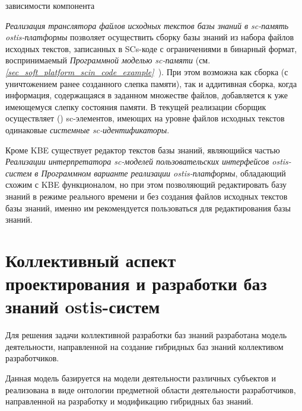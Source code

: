\begin{SCn}

\begin{scnrelfromset}{зависимости компонента}
\end{scnrelfromset}
\end{SCn}

\textit{Реализация транслятора файлов исходных текстов базы знаний в sc-память ostis-платформы} позволяет осуществить сборку базы знаний из набора файлов исходных текстов, записанных в SCs-коде с ограничениями в бинарный формат, воспринимаемый \textit{Программной моделью sc-памяти} (см. \textit{\ref{sec_soft_platform_scin_code_example}~}).
При этом возможна как сборка  (с уничтожением ранее созданного слепка памяти), так и аддитивная сборка, когда информация, содержащаяся в заданном множестве файлов, добавляется к уже имеющемуся слепку состояния памяти.
В текущей реализации сборщик осуществляет  () sc-элементов, имеющих на уровне файлов исходных текстов одинаковые \textit{системные sc-идентификаторы}.

Кроме KBE существует редактор текстов базы знаний, являющийся частью \textit{Реализации интерпретатора sc-моделей пользовательских интерфейсов ostis-систем в Программном варианте реализации ostis-платформы}, обладающий схожим с KBE функционалом, но при этом позволяющий редактировать базу знаний в режиме реального времени и без создания файлов исходных текстов базы знаний, именно им рекомендуется пользоваться для редактирования базы знаний.

\section{Коллективный аспект проектирования и разработки баз знаний ostis-систем}
\label{sec_kb_design_collective}

Для решения задачи коллективной разработки баз знаний разработана модель деятельности, направленной на создание гибридных баз знаний коллективом разработчиков.

Данная модель базируется на модели деятельности различных субъектов и реализована в виде онтологии предметной области деятельности разработчиков, направленной на разработку и модификацию гибридных баз знаний.

